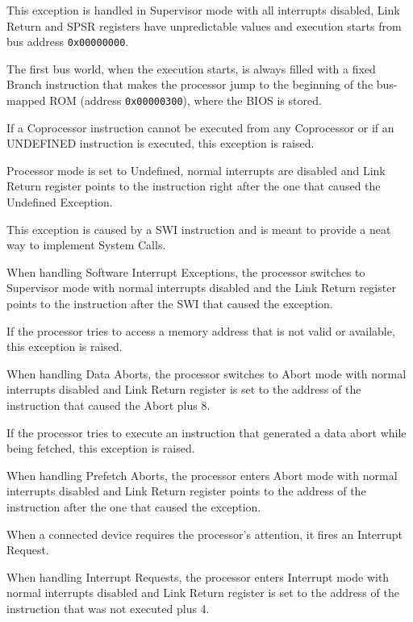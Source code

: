This exception is handled in Supervisor mode with all interrupts disabled, Link Return and SPSR registers have unpredictable values and execution starts from bus address \texttt{0x00000000}.

The first bus world, when the execution starts, is always filled with a fixed Branch instruction that makes the processor jump to the beginning of the bus-mapped ROM (address \texttt{0x00000300}), where the BIOS is stored.

If a Coprocessor instruction cannot be executed from any Coprocessor or if an UNDEFINED instruction is executed, this exception is raised. 

Processor mode is set to Undefined, normal interrupts are disabled and Link Return register points to the instruction right after the one that caused the Undefined Exception.

This exception is caused by a SWI instruction and is meant to provide a neat way to implement System Calls. 

When handling Software Interrupt Exceptions, the processor switches to Supervisor mode with normal interrupts disabled and the Link Return register points to the instruction after the SWI that caused the exception.

If the processor tries to access a memory address that is not valid or available, this exception is raised.

When handling Data Aborts, the processor switches to Abort mode with normal interrupts disabled and Link Return register is set to the address of the instruction that caused the Abort plus 8.


If the processor tries to execute an instruction that generated a data abort while being fetched, this exception is raised.

When handling Prefetch Aborts, the processor enters Abort mode with normal interrupts disabled and Link Return register points to the address of the instruction after the one that caused the exception.

When a connected device requires the processor's attention, it fires an Interrupt Request.

When handling Interrupt Requests, the processor enters Interrupt mode with normal interrupts disabled and Link Return register is set to the address of the instruction that was not executed plus 4.

